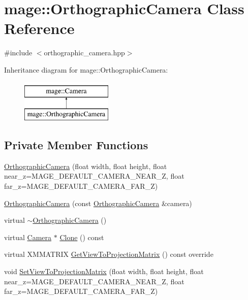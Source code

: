 \hypertarget{classmage_1_1_orthographic_camera}{}\section{mage\+:\+:Orthographic\+Camera Class Reference}
\label{classmage_1_1_orthographic_camera}


{\ttfamily \#include $<$orthographic\+\_\+camera.\+hpp$>$}

Inheritance diagram for mage\+:\+:Orthographic\+Camera\+:\begin{figure}[H]
\begin{center}
\leavevmode
\includegraphics[height=2.000000cm]{classmage_1_1_orthographic_camera}
\end{center}
\end{figure}
\subsection*{Private Member Functions}
\begin{DoxyCompactItemize}
\item 
\hyperlink{classmage_1_1_orthographic_camera_a02855f1a1830b51d98cf7c6adb22bf11}{Orthographic\+Camera} (float width, float height, float near\+\_\+z=M\+A\+G\+E\+\_\+\+D\+E\+F\+A\+U\+L\+T\+\_\+\+C\+A\+M\+E\+R\+A\+\_\+\+N\+E\+A\+R\+\_\+Z, float far\+\_\+z=M\+A\+G\+E\+\_\+\+D\+E\+F\+A\+U\+L\+T\+\_\+\+C\+A\+M\+E\+R\+A\+\_\+\+F\+A\+R\+\_\+Z)
\item 
\hyperlink{classmage_1_1_orthographic_camera_aad12a2901577a187bb53e4c2e2f5a658}{Orthographic\+Camera} (const \hyperlink{classmage_1_1_orthographic_camera}{Orthographic\+Camera} \&camera)
\item 
virtual \hyperlink{classmage_1_1_orthographic_camera_a2ab3dbd44e2a6fad6a88e3733cc22ac9}{$\sim$\+Orthographic\+Camera} ()
\item 
virtual \hyperlink{classmage_1_1_camera}{Camera} $\ast$ \hyperlink{classmage_1_1_orthographic_camera_a3fc2e5cfe7283670937de2a4841a5428}{Clone} () const
\item 
virtual X\+M\+M\+A\+T\+R\+IX \hyperlink{classmage_1_1_orthographic_camera_aedd86e56a0f7bc967ad8d9be2631a0cf}{Get\+View\+To\+Projection\+Matrix} () const override
\item 
void \hyperlink{classmage_1_1_orthographic_camera_a1ff2b3e4467049b978155d652a687c2d}{Set\+View\+To\+Projection\+Matrix} (float width, float height, float near\+\_\+z=M\+A\+G\+E\+\_\+\+D\+E\+F\+A\+U\+L\+T\+\_\+\+C\+A\+M\+E\+R\+A\+\_\+\+N\+E\+A\+R\+\_\+Z, float far\+\_\+z=M\+A\+G\+E\+\_\+\+D\+E\+F\+A\+U\+L\+T\+\_\+\+C\+A\+M\+E\+R\+A\+\_\+\+F\+A\+R\+\_\+Z)
\end{DoxyCompactItemize}
